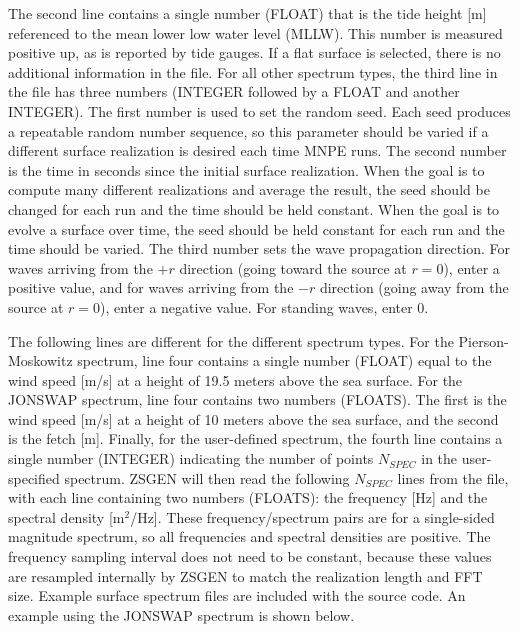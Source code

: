 The second line contains a single number (FLOAT) that is the tide height [m] referenced to the mean lower low water level (MLLW). This number is measured positive up, as is reported by tide gauges. If a flat surface is selected, there is no additional information in the file. For all other spectrum types, the third line in the file has three numbers (INTEGER followed by a FLOAT and another INTEGER). The first number is used to set the random seed. Each seed produces a repeatable random number sequence, so this parameter should be varied if a different surface realization is desired each time MNPE runs. The second number is the time in seconds since the initial surface realization. When the goal is to compute many different realizations and average the result, the seed should be changed for each run and the time should be held constant. When the goal is to evolve a surface over time, the seed should be held constant for each run and the time should be varied. The third number sets the wave propagation direction. For waves arriving from the $+r$ direction (going toward the source at $r=0$), enter a positive value, and for waves arriving from the $-r$ direction (going away from the source at $r=0$), enter a negative value. For standing waves, enter 0.

The following lines are different for the different spectrum types. For the Pierson-Moskowitz spectrum\cite{PM}, line four contains a single number (FLOAT) equal to the wind speed [m/s] at a height of 19.5 meters above the sea surface. For the JONSWAP spectrum\cite{JONSWAP}, line four contains two numbers (FLOATS). The first is the wind speed [m/s] at a height of 10 meters above the sea surface, and the second is the fetch [m]. Finally, for the user-defined spectrum, the fourth line contains a single number (INTEGER) indicating the number of points $N_{SPEC}$ in the user-specified spectrum. ZSGEN will then read the following $N_{SPEC}$ lines from the file, with each line containing two numbers (FLOATS): the frequency [Hz] and the spectral density [m$^2$/Hz]. These frequency/spectrum pairs are for a single-sided magnitude spectrum, so all frequencies and spectral densities are positive. The frequency sampling interval does not need to be constant, because these values are resampled internally by ZSGEN to match the realization length and FFT size. Example surface spectrum files are included with the source code. An example using the JONSWAP spectrum is shown below.

\newpage


